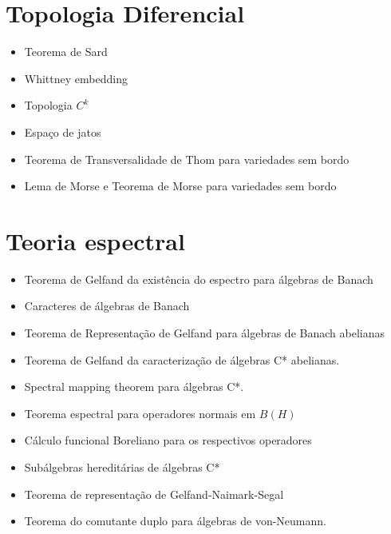\documentclass{article}
\begin{document}
\section{Topologia Diferencial}
\begin{itemize}
    \item Teorema de Sard 
    \item Whittney embedding 
    \item Topologia $C^k$ 
    \item Espaço de jatos 
   
    \item Teorema de Transversalidade de Thom para variedades sem bordo
    \item Lema de Morse e Teorema de Morse para variedades sem bordo
   
\end{itemize}


\section{Teoria espectral}

\begin{itemize}
    \item Teorema de Gelfand da existência do espectro para álgebras de Banach
    \item Caracteres de álgebras de Banach
    \item Teorema de Representação de Gelfand para álgebras de Banach abelianas
    \item Teorema de Gelfand da caracterização de álgebras C* abelianas.
    \item Spectral mapping theorem para álgebras C*.
    \item Teorema espectral para operadores normais em $B(H)$
    \item Cálculo funcional Boreliano para os respectivos operadores
    \item Subálgebras hereditárias de álgebras C*
    \item Teorema de representação de Gelfand-Naimark-Segal
    \item Teorema do comutante duplo para álgebras de von-Neumann. 


\end{itemize}
\end{document}
